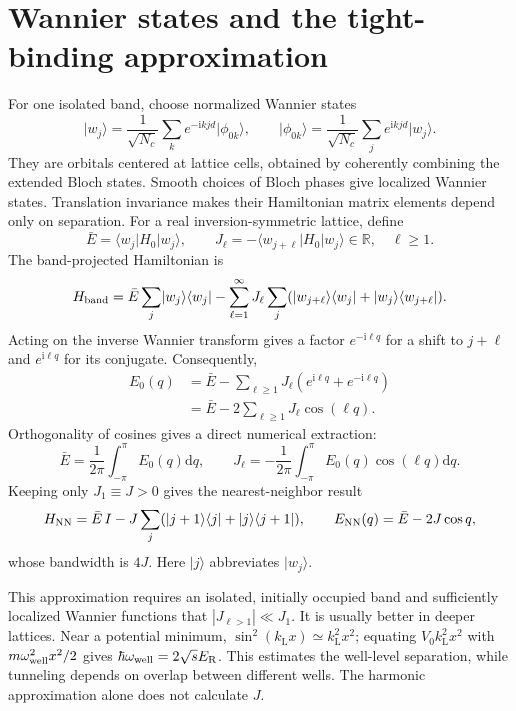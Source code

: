 \documentclass[11pt,oneside]{report}
\numberwithin{equation}{chapter}
\newcommand{\ER}{E_{\mathrm R}}
\newcommand{\ii}{\mathrm i}
\newcommand{\dd}{\mathrm d}
\newcommand{\ket}[1]{\lvert #1\rangle}
\newcommand{\bra}[1]{\langle #1\rvert}
\begin{document}
\section{Wannier states and the tight-binding approximation}
For one isolated band, choose normalized Wannier states
\begin{equation}
 \ket{w_j}=\frac{1}{\sqrt{N_c}}\sum_k e^{-\ii kjd}\ket{\phi_{0k}},\qquad
 \ket{\phi_{0k}}=\frac{1}{\sqrt{N_c}}\sum_j e^{\ii kjd}\ket{w_j}.
\end{equation}
They are orbitals centered at lattice cells, obtained by coherently combining the extended Bloch states. Smooth choices of Bloch phases give localized Wannier states. Translation invariance makes their Hamiltonian matrix elements depend only on separation. For a real inversion-symmetric lattice, define
\begin{equation}
 \bar E=\bra{w_j}H_0\ket{w_j},\qquad J_\ell=-\bra{w_{j+\ell}}H_0\ket{w_j}\in\mathbb R,\quad \ell\geq1.
\end{equation}
The band-projected Hamiltonian is
\begin{equation}\label{eq:longrangeH}
 H_{\rm band}=\bar E\sum_j\ket{w_j}\bra{w_j}
 -\sum_{\ell=1}^{\infty}J_\ell\sum_j(\ket{w_{j+\ell}}\bra{w_j}+\ket{w_j}\bra{w_{j+\ell}}).
\end{equation}
Acting on the inverse Wannier transform gives a factor $e^{-\ii\ell q}$ for a shift to $j+\ell$ and $e^{\ii\ell q}$ for its conjugate. Consequently,
\begin{align}
 E_0(q)&=\bar E-\sum_{\ell\geq1}J_\ell(e^{\ii\ell q}+e^{-\ii\ell q})\nonumber\\
 &=\bar E-2\sum_{\ell\geq1}J_\ell\cos(\ell q).\label{eq:fourierband}
\end{align}
Orthogonality of cosines gives a direct numerical extraction:
\begin{equation}\label{eq:hoppingextract}
 \bar E=\frac{1}{2\pi}\int_{-\pi}^{\pi}E_0(q)\dd q,\qquad
 J_\ell=-\frac{1}{2\pi}\int_{-\pi}^{\pi}E_0(q)\cos(\ell q)\dd q.
\end{equation}
Keeping only $J_1\equiv J>0$ gives the nearest-neighbor result
\begin{equation}\label{eq:cosine}
 H_{\rm NN}=\bar E\,I-J\sum_j(\ket{j+1}\bra j+\ket j\bra{j+1}),\qquad E_{\rm NN}(q)=\bar E-2J\cos q,
\end{equation}
whose bandwidth is $4J$. Here $\ket j$ abbreviates $\ket{w_j}$.

This approximation requires an isolated, initially occupied band and sufficiently localized Wannier functions that $|J_{\ell>1}|\ll J_1$. It is usually better in deeper lattices. Near a potential minimum, $\sin^2(k_{\mathrm L}x)\simeq k_{\mathrm L}^2x^2$; equating $V_0 k_{\mathrm L}^2x^2$ with $m\omega_{\rm well}^2x^2/2$ gives $\hbar\omega_{\rm well}=2\sqrt{s}\ER$. This estimates the well-level separation, while tunneling depends on overlap between different wells. The harmonic approximation alone does not calculate $J$.
\end{document}
